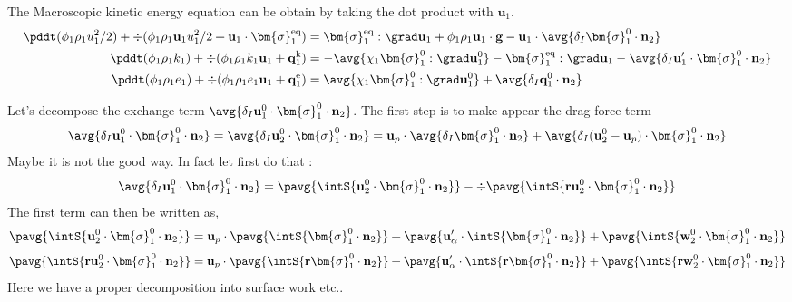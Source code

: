 The Macroscopic kinetic energy equation can be obtain by taking the dot product with $\textbf{u}_1$. 
\begin{align}
    \pddt (\phi_1 \rho_1u_1^2/2)  
    + \div (
        \phi_1 \rho_1\textbf{u}_1u_1^2/2
        + \textbf{u}_1 \cdot \bm{\sigma}_1^\text{eq}
    )
    &= 
     \bm{\sigma}_1^\text{eq} : \grad \textbf{u}_1
    + \phi_1 \rho_1 \textbf{u}_1\cdot \textbf{g} 
    -  \textbf{u}_1\cdot \avg{\delta_I \bm{\sigma}_1^0 \cdot \textbf{n}_2}\\
    \pddt (\phi_1\rho_1k_1)  
    + \div (
        \phi_1\rho_1k_1\textbf{u}_1
        + \textbf{q}_1^\text{k} 
        )
    &= 
    - \avg{\chi_1\bm{\sigma}_1^0 : \grad \textbf{u}_1^0}
    - \bm{\sigma}_1^\text{eq} : \grad \textbf{u}_1
    - \avg{\delta_I \textbf{u}_1' \cdot \bm{\sigma}_1^0 \cdot \textbf{n}_2}\\
    \pddt (\phi_1\rho_1e_1)  
    + \div (
        \phi_1 \rho_1e_1\textbf{u}_1
        +
        \textbf{q}_1^\text{e} 
        )
    &= 
    \avg{\chi_1\bm{\sigma}_1^0 : \grad \textbf{u}_1^0}
    + \avg{\delta_I \textbf{q}_1^0 \cdot \textbf{n}_2} 
\end{align}


Let's decompose the exchange term $\avg{\delta_I \textbf{u}^0_1 \cdot \bm{\sigma}_1^0 \cdot \textbf{n}_2}$.
The first step is to make appear the drag force term 
\begin{align*}
    \avg{\delta_I \textbf{u}^0_1 \cdot \bm{\sigma}_1^0 \cdot \textbf{n}_2}
    = 
    \avg{\delta_I \textbf{u}^0_2 \cdot \bm{\sigma}_1^0 \cdot \textbf{n}_2}
    =
    \textbf{u}_p \cdot  \avg{\delta_I \bm{\sigma}_1^0 \cdot \textbf{n}_2}
    + \avg{\delta_I (\textbf{u}^0_2 - \textbf{u}_p) \cdot \bm{\sigma}_1^0 \cdot \textbf{n}_2}
\end{align*}
Maybe it is not the good way. In fact let first do that : 
\begin{align*}
    \avg{\delta_I \textbf{u}^0_1 \cdot \bm{\sigma}_1^0 \cdot \textbf{n}_2}
    =
    \pavg{ \intS{\textbf{u}^0_2 \cdot \bm{\sigma}_1^0 \cdot \textbf{n}_2}}
    - \div\pavg{ \intS{\textbf{r}\textbf{u}^0_2 \cdot \bm{\sigma}_1^0 \cdot \textbf{n}_2}}
\end{align*}
The first term can then be written as, 
\begin{align*}
    \pavg{ \intS{\textbf{u}^0_2 \cdot \bm{\sigma}_1^0 \cdot \textbf{n}_2}}
    = 
    \textbf{u}_p \cdot \pavg{\intS{\bm{\sigma}_1^0 \cdot \textbf{n}_2}}
    + \pavg{ \textbf{u}_\alpha' \cdot \intS{  \bm{\sigma}_1^0 \cdot \textbf{n}_2}}
    + \pavg{ \intS{\textbf{w}_2^0 \cdot \bm{\sigma}_1^0 \cdot \textbf{n}_2}}
\end{align*}
\begin{align*}
    \pavg{ \intS{\textbf{r}\textbf{u}^0_2 \cdot \bm{\sigma}_1^0 \cdot \textbf{n}_2}}
    = 
    \textbf{u}_p \cdot \pavg{\intS{ \textbf{r}\bm{\sigma}_1^0 \cdot \textbf{n}_2}}
    + \pavg{ \textbf{u}_\alpha' \cdot \intS{ \textbf{r} \bm{\sigma}_1^0 \cdot \textbf{n}_2}}
    + \pavg{ \intS{\textbf{r}\textbf{w}_2^0 \cdot \bm{\sigma}_1^0 \cdot \textbf{n}_2}}
\end{align*}
Here we have a proper decomposition into surface work etc.. 


